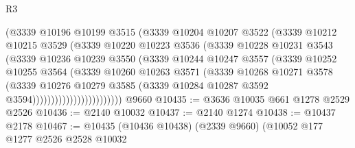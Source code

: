 \begin{lexlean}{R3}
\begin{coremodule}
                            (@3339
                              @10196
                              @10199
                              @3515
                              (@3339
                                @10204
                                @10207
                                @3522
                                (@3339
                                  @10212
                                  @10215
                                  @3529
                                  (@3339
                                    @10220
                                    @10223
                                    @3536
                                    (@3339
                                      @10228
                                      @10231
                                      @3543
                                      (@3339
                                        @10236
                                        @10239
                                        @3550
                                        (@3339
                                          @10244
                                          @10247
                                          @3557
                                          (@3339
                                            @10252
                                            @10255
                                            @3564
                                            (@3339
                                              @10260
                                              @10263
                                              @3571
                                              (@3339
                                                @10268
                                                @10271
                                                @3578
                                                (@3339
                                                  @10276
                                                  @10279
                                                  @3585
                                                  (@3339
                                                    @10284
                                                    @10287
                                                    @3592
                                                    @3594))))))))))))))))))))))))
    @9660
@10435 := @3636 @10035 @661 @1278 @2529 @2526
@10436 := @2140 @10032
@10437 := @2140 @1274
@10438 := @10437 @2178
@10467 := @10435
    (@10436 @10438)
    (@2339 @9660)
    (@10052
      @177
      @1277
      @2526
      @2528
      @10032

\end{coremodule}
\end{lexlean}
